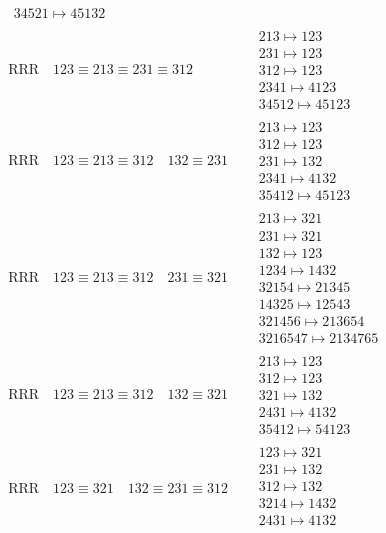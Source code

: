 \documentclass{article}
\begin{document}
\begin{align}
\begin{matrix}
34521 \mapsto 45132
\end{matrix}
\\
\text{RRR}
\quad
123\equiv213\equiv231\equiv312
\quad
&
\begin{matrix}
213 \mapsto 123
\\
231 \mapsto 123
\\
312 \mapsto 123
\\
2341 \mapsto 4123
\\
34512 \mapsto 45123
\end{matrix}
\\
\text{RRR}
\quad
123\equiv213\equiv312
\quad
132\equiv231
\quad
&
\begin{matrix}
213 \mapsto 123
\\
312 \mapsto 123
\\
231 \mapsto 132
\\
2341 \mapsto 4132
\\
35412 \mapsto 45123
\end{matrix}
\\
\text{RRR}
\quad
123\equiv213\equiv312
\quad
231\equiv321
\quad
&
\begin{matrix}
213 \mapsto 321
\\
231 \mapsto 321
\\
132 \mapsto 123
\\
1234 \mapsto 1432
\\
32154 \mapsto 21345
\\
14325 \mapsto 12543
\\
321456 \mapsto 213654
\\
3216547 \mapsto 2134765
\end{matrix}
\\
\text{RRR}
\quad
123\equiv213\equiv312
\quad
132\equiv321
\quad
&
\begin{matrix}
213 \mapsto 123
\\
312 \mapsto 123
\\
321 \mapsto 132
\\
2431 \mapsto 4132
\\
35412 \mapsto 54123
\end{matrix}
\\
\text{RRR}
\quad
123\equiv321
\quad
132\equiv231\equiv312
\quad
&
\begin{matrix}
123 \mapsto 321
\\
231 \mapsto 132
\\
312 \mapsto 132
\\
3214 \mapsto 1432
\\
2431 \mapsto 4132
\\

\end{matrix}
\end{align}
\end{document}
